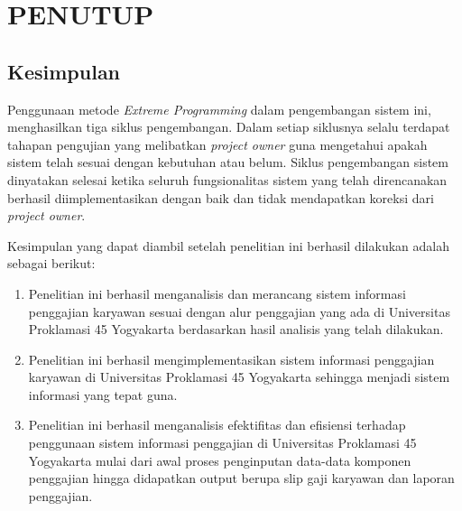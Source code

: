 
\chapter{PENUTUP}

\section{Kesimpulan}
Penggunaan metode \emph{Extreme Programming} dalam pengembangan sistem ini, menghasilkan tiga siklus pengembangan. Dalam setiap siklusnya selalu terdapat tahapan pengujian yang melibatkan \emph{project owner} guna mengetahui apakah sistem telah sesuai dengan kebutuhan atau belum. Siklus pengembangan sistem dinyatakan selesai ketika seluruh fungsionalitas sistem yang telah direncanakan berhasil diimplementasikan dengan baik dan tidak mendapatkan koreksi dari \emph{project owner}.

Kesimpulan yang dapat diambil setelah penelitian ini berhasil dilakukan adalah sebagai berikut:
\begin{enumerate}
    \itemsep0em
    \item Penelitian ini berhasil menganalisis dan merancang sistem informasi penggajian karyawan sesuai dengan alur penggajian yang ada di Universitas Proklamasi 45 Yogyakarta berdasarkan hasil analisis yang telah dilakukan.
    \item Penelitian ini berhasil mengimplementasikan sistem informasi penggajian karyawan di Universitas Proklamasi 45 Yogyakarta sehingga menjadi sistem informasi yang tepat guna.
    \item Penelitian ini berhasil menganalisis efektifitas dan efisiensi terhadap penggunaan sistem informasi penggajian di Universitas Proklamasi 45 Yogyakarta mulai dari awal proses penginputan data-data komponen penggajian hingga didapatkan output berupa slip gaji karyawan dan laporan penggajian.
\end{enumerate}

